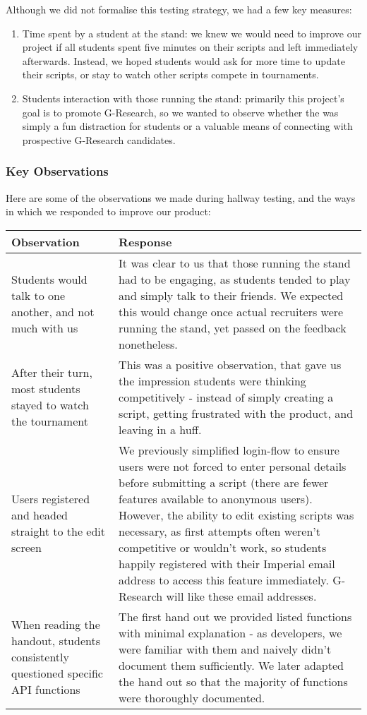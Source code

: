 Although we did not formalise this testing strategy, we had a few key measures:
\begin{enumerate} \itemsep -1pt 
\item Time spent by a student at the stand: we knew we would need to improve our project if all students spent five minutes on their scripts and left immediately afterwards. Instead, we hoped students would ask for more time to update their scripts, or stay to watch other scripts compete in tournaments. 
\item Students interaction with those running the stand: primarily this project's goal is to promote G-Research, so we wanted to observe whether the \project was simply a fun distraction for students or a valuable means of connecting with prospective G-Research candidates. 
\end{enumerate}

\subsubsection{Key Observations}

Here are some of the observations we made during hallway testing, and the ways in which we responded to improve our product: \\

\begin{tabularx}{\textwidth}{ | X | p{} |}
\hline
Observation & Response \\
\hline\hline
Students would talk to one another, and not much with us 
	& It was clear to us that those running the stand had to be engaging, as students tended to play and simply talk to their friends. We expected this would change once actual recruiters were running the stand, yet passed on the feedback nonetheless. \\ \hline
After their turn, most students stayed to watch the tournament
	& This was a positive observation, that gave us the impression students were thinking competitively - instead of simply creating a script, getting frustrated with the product, and leaving in a huff. \\ \hline 
Users registered and headed straight to the edit screen 
	& We previously simplified login-flow to ensure users were not forced to enter personal details before submitting a script (there are fewer features available to anonymous users). However, the ability to edit existing scripts was necessary, as first attempts often weren't competitive or wouldn't work, so students happily registered with their Imperial email address to access this feature immediately. G-Research will like these email addresses. \\ \hline 
When reading the handout, students consistently questioned specific API functions
	& The first hand out we provided listed functions with minimal explanation - as developers, we were familiar with them and naively didn't document them sufficiently. We later adapted the hand out so that the majority of functions were thoroughly documented. \\ 
\hline
\end{tabularx}

